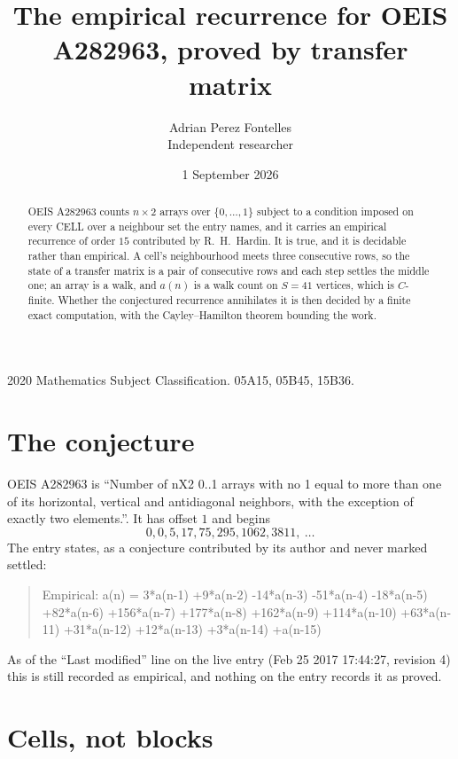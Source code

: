 \documentclass[11pt,a4paper]{article}
\title{The empirical recurrence for OEIS A282963, proved by transfer matrix}
\author{Adrian Perez Fontelles\\ \small Independent researcher}
\date{1 September 2026}
\theoremstyle{plain}
\theoremstyle{definition}
\begin{document}
\maketitle

\begin{abstract}
OEIS A282963 counts $n\times2$ arrays over $\{0,\dots,1\}$ subject to a condition imposed on
every CELL over a neighbour set the entry names, and it carries an empirical recurrence of
order $15$ contributed by R.~H.~Hardin. It is true, and it is decidable rather than
empirical. A cell's neighbourhood meets three consecutive rows, so the state of a transfer
matrix is a pair of consecutive rows and each step settles the middle one; an array is a
walk, and $a(n)$ is a walk count on $S=41$ vertices, which is $C$-finite. Whether the
conjectured recurrence annihilates it is then decided by a finite exact computation, with the
Cayley--Hamilton theorem bounding the work.
\end{abstract}

\noindent\small 2020 Mathematics Subject Classification. 05A15, 05B45, 15B36.\normalsize

\section{The conjecture}

OEIS A282963 is ``Number of nX2 0..1 arrays with no 1 equal to more than one of its horizontal, vertical and antidiagonal neighbors, with the exception of exactly two elements.''. It has offset $1$ and begins
\[
0, 0, 5, 17, 75, 295, 1062, 3811,\ \dots
\]
The entry states, as a conjecture contributed by its author and never marked settled:
\begin{quote}
Empirical: a(n) = 3*a(n-1) +9*a(n-2) -14*a(n-3) -51*a(n-4) -18*a(n-5) +82*a(n-6) +156*a(n-7) +177*a(n-8) +162*a(n-9) +114*a(n-10) +63*a(n-11) +31*a(n-12) +12*a(n-13) +3*a(n-14) +a(n-15)
\end{quote}
As of the ``Last modified'' line on the live entry (Feb 25 2017 17:44:27, revision 4) this is still
recorded as empirical, and nothing on the entry records it as proved.

\section{Cells, not blocks}
\end{document}
